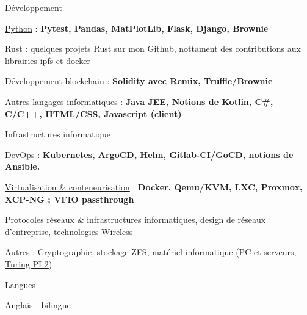 \begin{cventries}
  \cventry
    {} %
    {Développement} %
    {} %
    {} %
    {
      \begin{cvitems} %
        \item {\underline{Python} : \textbf{Pytest, Pandas, MatPlotLib, Flask, Django, Brownie}}
        \item {\underline{Rust} : \href{https://github.com/guillheu?tab=repositories&q=&type=&language=rust&sort=}{quelques projets Rust sur mon Github}, nottament des contributions aux librairies ipfs et docker}
        \item {\underline{Développement blockchain} : \textbf{Solidity avec Remix, Truffle/Brownie}}
        \item {Autres langages informatiques : \textbf{Java JEE, Notions de Kotlin, C\#, C/C++, HTML/CSS, Javascript (client)}}
      \end{cvitems}
    }
  \cventry
    {} %
    {Infrastructures informatique} %
    {} %
    {} %
    {
      \begin{cvitems} %
        \item {\underline{DevOps} : \textbf{Kubernetes, ArgoCD, Helm, Gitlab-CI/GoCD, notions de Ansible.}}
        \item {\underline{Virtualisation \& conteneurisation} : \textbf{Docker, Qemu/KVM, LXC, Proxmox, XCP-NG ; VFIO passthrough}}
        \item {Protocoles réseaux \& infrastructures informatiques, design de réseaux d'entreprise, technologies Wireless}
        \item {Autres : Cryptographie, stockage ZFS, matériel informatique (PC et serveurs, \href{https://turingpi.com/}{Turing PI 2})\\}
      \end{cvitems}
    }
  \cventry
    {} %
    {Langues} %
    {} %
    {} %
    {
      \begin{cvitems} %
        \item {Anglais - bilingue}
      \end{cvitems}
    }
\end{cventries}